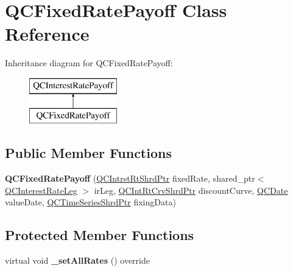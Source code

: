 \hypertarget{class_q_c_fixed_rate_payoff}{\section{Q\+C\+Fixed\+Rate\+Payoff Class Reference}
\label{class_q_c_fixed_rate_payoff}
}
Inheritance diagram for Q\+C\+Fixed\+Rate\+Payoff\+:\begin{figure}[H]
\begin{center}
\leavevmode
\includegraphics[height=2.000000cm]{class_q_c_fixed_rate_payoff}
\end{center}
\end{figure}
\subsection*{Public Member Functions}
\begin{DoxyCompactItemize}
\item 
\hypertarget{class_q_c_fixed_rate_payoff_a2347ff4dfef65aeda3a9f890cd83a3d8}{{\bfseries Q\+C\+Fixed\+Rate\+Payoff} (\hyperlink{_q_c_definitions_8h_ae6a21ad26d19e482e3b01179cbc05298}{Q\+C\+Intrst\+Rt\+Shrd\+Ptr} fixed\+Rate, shared\+\_\+ptr$<$ \hyperlink{class_q_c_interest_rate_leg}{Q\+C\+Interest\+Rate\+Leg} $>$ ir\+Leg, \hyperlink{_q_c_definitions_8h_a4b4fb466e49550e3dfd40003562cd19d}{Q\+C\+Int\+Rt\+Crv\+Shrd\+Ptr} discount\+Curve, \hyperlink{class_q_c_date}{Q\+C\+Date} value\+Date, \hyperlink{_q_c_definitions_8h_a6a601ffd693c05dd81309e3dca08b8f5}{Q\+C\+Time\+Series\+Shrd\+Ptr} fixing\+Data)}\label{class_q_c_fixed_rate_payoff_a2347ff4dfef65aeda3a9f890cd83a3d8}

\end{DoxyCompactItemize}
\subsection*{Protected Member Functions}
\begin{DoxyCompactItemize}
\item 
\hypertarget{class_q_c_fixed_rate_payoff_a7e20ddb8fb717480958a2eced9a4cf93}{virtual void {\bfseries \+\_\+set\+All\+Rates} () override}\label{class_q_c_fixed_rate_payoff_a7e20ddb8fb717480958a2eced9a4cf93}

\end{DoxyCompactItemize}
